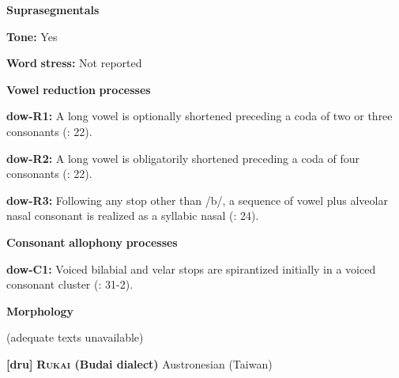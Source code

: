 \documentclass[output=paper]{langsci/langscibook}
\begin{document}
\begin{styleBody}
\textbf{Suprasegmentals}
\end{styleBody}

\begin{styleBody}
\textbf{Tone:} Yes
\end{styleBody}

\begin{styleBody}
\textbf{Word} \textbf{stress:} Not reported
\end{styleBody}

\begin{styleBody}
\textbf{Vowel} \textbf{reduction} \textbf{processes}
\end{styleBody}

\begin{styleBody}
\textbf{dow-R1:} A long vowel is optionally shortened preceding a coda of two or three consonants (\citealt{WieringWiering1994}: 22).
\end{styleBody}

\begin{styleBody}
\textbf{dow-R2:} A long vowel is obligatorily shortened preceding a coda of four consonants (\citealt{WieringWiering1994}: 22).
\end{styleBody}

\begin{styleBody}
\textbf{dow-R3:} Following any stop other than /b/, a sequence of vowel plus alveolar nasal consonant is realized as a syllabic nasal (\citealt{WieringWiering1994}: 24).
\end{styleBody}

\begin{styleBody}
\textbf{Consonant} \textbf{allophony} \textbf{processes}
\end{styleBody}

\begin{styleBody}
\textbf{dow-C1:} Voiced bilabial and velar stops are spirantized initially in a voiced consonant cluster (\citealt{WieringWiering1994}: 31-2).
\end{styleBody}

\begin{styleBody}
\textbf{Morphology}
\end{styleBody}

\begin{styleBody}
(adequate texts unavailable)
\end{styleBody}

\begin{styleBody}
\textbf{[dru]}   \textbf{\textsc{Rukai} \textbf{(Budai} \textbf{dialect)}  }Austronesian (Taiwan)
\end{styleBody}
\end{document}
